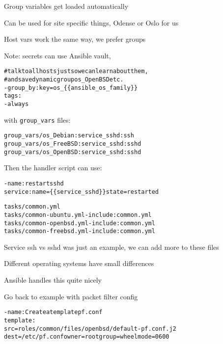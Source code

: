 \documentclass[18pt,landscape,a4paper,footrule]{foils}
\begin{document}
\begin{list2}
\item Group variables get loaded automatically
\item Can be used for site specific things, Odense or Oslo for us
\item Host vars work the same way, we prefer groups
\item Note: secrets can use Ansible vault, 
\end{list2}



\begin{alltt}
  # talk to all hosts just so we can learn about them,
  # and save dynamic group os_OpenBSD etc.
  - group_by: key=os_\{\{ ansible_os_family \}\}
    tags:
        - always
\end{alltt}

with \verb+group_vars+ files:
\begin{alltt}
group_vars/os_Debian:service_sshd: ssh
group_vars/os_FreeBSD:service_sshd: sshd
group_vars/os_OpenBSD:service_sshd: sshd
\end{alltt}

Then the handler script can use:
\begin{alltt}
  - name: restart sshd
    service: name=\{\{ service_sshd \}\} state=restarted
\end{alltt}




\begin{alltt}
tasks/common.yml
tasks/common-ubuntu.yml - include: common.yml
tasks/common-openbsd.yml - include: common.yml
tasks/common-freebsd.yml - include: common.yml
\end{alltt}

\begin{list2}
\item Service ssh vs sshd was just an example, we can add more to these files
\item Different operating systems have small differences
\item Ansible handles this quite nicely
\end{list2}



Go back to example with packet filter config

\begin{alltt}
  - name: Create a template pf.conf
    template:
        src=roles/common/files/openbsd/default-pf.conf.j2
        dest=/etc/pf.conf owner=root group=wheel mode=0600
\end{alltt}
\end{document}
